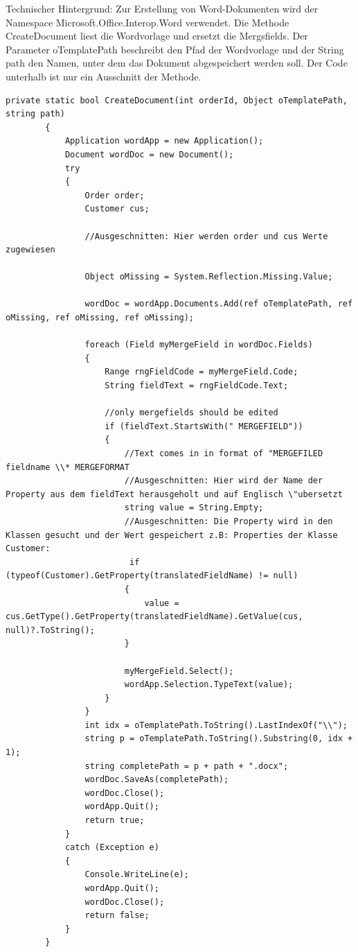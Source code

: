 Technischer Hintergrund:
Zur Erstellung von Word-Dokumenten wird der Namespace Microsoft.Office.Interop.Word verwendet. Die Methode CreateDocument liest die Wordvorlage und ersetzt die Mergsfields. Der Parameter oTemplatePath beschreibt den Pfad der Wordvorlage und der String path den Namen, unter dem das Dokument abgespeichert werden soll. Der Code unterhalb ist nur ein Ausschnitt der Methode.
\begin{lstlisting}
private static bool CreateDocument(int orderId, Object oTemplatePath, string path)
        {
            Application wordApp = new Application();
            Document wordDoc = new Document();
            try
            {
                Order order;
                Customer cus;
				
				//Ausgeschnitten: Hier werden order und cus Werte zugewiesen 
				
                Object oMissing = System.Reflection.Missing.Value;

                wordDoc = wordApp.Documents.Add(ref oTemplatePath, ref oMissing, ref oMissing, ref oMissing);

                foreach (Field myMergeField in wordDoc.Fields)
                {
                    Range rngFieldCode = myMergeField.Code;
                    String fieldText = rngFieldCode.Text;

                    //only mergefields should be edited
                    if (fieldText.StartsWith(" MERGEFIELD"))
                    {
                        //Text comes in in format of "MERGEFILED fieldname \\* MERGEFORMAT
                        //Ausgeschnitten: Hier wird der Name der Property aus dem fieldText herausgeholt und auf Englisch \"ubersetzt
                        string value = String.Empty;
                        //Ausgeschnitten: Die Property wird in den Klassen gesucht und der Wert gespeichert z.B: Properties der Klasse Customer:
                         if (typeof(Customer).GetProperty(translatedFieldName) != null)
                        {
                            value = cus.GetType().GetProperty(translatedFieldName).GetValue(cus, null)?.ToString();
                        }
                        
                        myMergeField.Select();
                        wordApp.Selection.TypeText(value);
                    }
                }
                int idx = oTemplatePath.ToString().LastIndexOf("\\");
                string p = oTemplatePath.ToString().Substring(0, idx + 1);
                string completePath = p + path + ".docx";
                wordDoc.SaveAs(completePath);
                wordDoc.Close();
                wordApp.Quit();
                return true;
            }
            catch (Exception e)
            {
                Console.WriteLine(e);
                wordApp.Quit();
                wordDoc.Close();
                return false;
            }
        }
\end{lstlisting}
